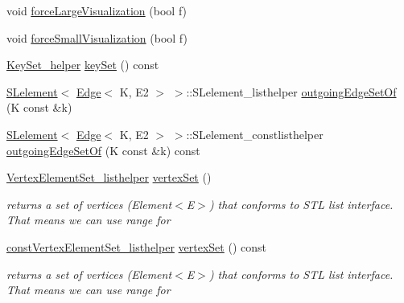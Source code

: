 \begin{DoxyCompactItemize}
\item 
void \hyperlink{classbridges_1_1datastructure_1_1_graph_adj_list_a6860a0a153fd126ebe8b1bc40d2753a7}{force\+Large\+Visualization} (bool f)
\item 
void \hyperlink{classbridges_1_1datastructure_1_1_graph_adj_list_a9706e3df7d30320b7e7773a6423e4ff7}{force\+Small\+Visualization} (bool f)
\item 
\hyperlink{classbridges_1_1datastructure_1_1_graph_adj_list_1_1_key_set__helper}{Key\+Set\+\_\+helper} \hyperlink{classbridges_1_1datastructure_1_1_graph_adj_list_a0562e8d82499f26ad656a1dfb5f8908e}{key\+Set} () const
\item 
\hyperlink{classbridges_1_1datastructure_1_1_s_lelement}{S\+Lelement}$<$ \hyperlink{classbridges_1_1datastructure_1_1_edge}{Edge}$<$ K, E2 $>$ $>$\+::S\+Lelement\+\_\+listhelper \hyperlink{classbridges_1_1datastructure_1_1_graph_adj_list_ac066da800ab88dc2e55a89650e08bb78}{outgoing\+Edge\+Set\+Of} (K const \&k)
\item 
\hyperlink{classbridges_1_1datastructure_1_1_s_lelement}{S\+Lelement}$<$ \hyperlink{classbridges_1_1datastructure_1_1_edge}{Edge}$<$ K, E2 $>$ $>$\+::S\+Lelement\+\_\+constlisthelper \hyperlink{classbridges_1_1datastructure_1_1_graph_adj_list_ab0677da029442194925f8167cc2b8638}{outgoing\+Edge\+Set\+Of} (K const \&k) const
\item 
\hyperlink{classbridges_1_1datastructure_1_1_graph_adj_list_1_1_vertex_element_set__listhelper}{Vertex\+Element\+Set\+\_\+listhelper} \hyperlink{classbridges_1_1datastructure_1_1_graph_adj_list_a9dcf0bb4a68f3b02281c84e9bb69d6b3}{vertex\+Set} ()
\begin{DoxyCompactList}\small\item\em returns a set of vertices (Element$<$\+E$>$) that conforms to S\+TL list interface. That means we can use range for \end{DoxyCompactList}\item 
\hyperlink{classbridges_1_1datastructure_1_1_graph_adj_list_1_1const_vertex_element_set__listhelper}{const\+Vertex\+Element\+Set\+\_\+listhelper} \hyperlink{classbridges_1_1datastructure_1_1_graph_adj_list_a5ef96f5df21b2f9743b7bb79c10cf090}{vertex\+Set} () const
\begin{DoxyCompactList}\small\item\em returns a set of vertices (Element$<$\+E$>$) that conforms to S\+TL list interface. That means we can use range for \end{DoxyCompactList}\end{DoxyCompactItemize}


